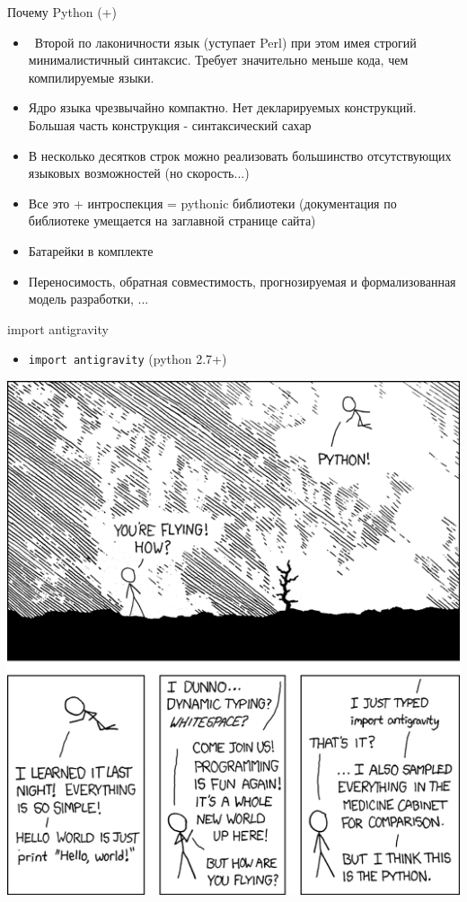 \documentclass{article}
\begin{document}
\begin{center} Почему Python (+) \end{center}
\begin{itemize}
    \item ~Второй по лаконичности язык (уступает Perl) при этом имея строгий 
            минималистичный синтаксис. Требует значительно меньше кода, чем компилируемые языки.
    \item Ядро языка чрезвычайно компактно. Нет декларируемых конструкций. 
            Большая часть конструкция - синтаксический сахар
    \item В несколько десятков строк можно реализовать большинство отсутствующих языковых возможностей
           (но скорость...)
    \item Все это + интроспекция = pythonic библиотеки 
        (документация по библиотеке умещается на заглавной странице сайта)
    \item Батарейки в комплекте
    \item Переносимость, обратная совместимость, прогнозируемая и формализованная модель разработки, ...
\end{itemize}
\newpage

\begin{center} import antigravity \end{center}
\begin{itemize}
    \item \lstinline!import antigravity! (python 2.7+)
\end{itemize}
\includegraphics[scale=0.6]{images/antigravity.png}
\newpage
\end{document}
